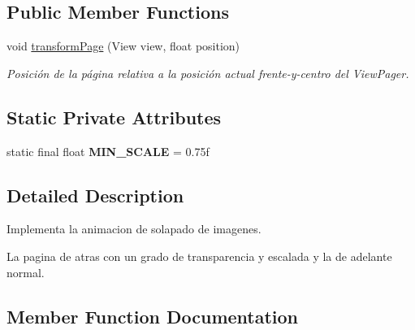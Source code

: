 \subsection*{Public Member Functions}
\begin{DoxyCompactItemize}
\item 
void \hyperlink{classcom_1_1example_1_1sebastian_1_1tindertp_1_1animationTools_1_1DepthPageTransformer_ae820f63d5a8e39e11a55be7f0f241c8a}{transform\+Page} (View view, float position)
\begin{DoxyCompactList}\small\item\em Posición de la página relativa a la posición actual frente-\/y-\/centro del View\+Pager. \end{DoxyCompactList}\end{DoxyCompactItemize}
\subsection*{Static Private Attributes}
\begin{DoxyCompactItemize}
\item 
static final float {\bfseries M\+I\+N\+\_\+\+S\+C\+A\+LE} = 0.\+75f\hypertarget{classcom_1_1example_1_1sebastian_1_1tindertp_1_1animationTools_1_1DepthPageTransformer_a963b46f25baa2514c25fb7b70eb2d5d8}{}\label{classcom_1_1example_1_1sebastian_1_1tindertp_1_1animationTools_1_1DepthPageTransformer_a963b46f25baa2514c25fb7b70eb2d5d8}

\end{DoxyCompactItemize}


\subsection{Detailed Description}
Implementa la animacion de solapado de imagenes. 

La pagina de atras con un grado de transparencia y escalada y la de adelante normal. 

\subsection{Member Function Documentation}
